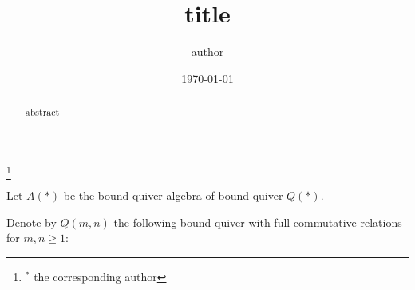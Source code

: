 \documentclass[a4paper, reqno]{amsart}
\theoremstyle{definition}
\theoremstyle{remark}
\numberwithin{equation}{section}
\begin{document}


\title[title]{title}

\author[author]{author}
\address{address}

\makeatletter {} \makeatother

\thanks{$^*$ the corresponding author}
\date{\today}
%
\maketitle


\begin{abstract}
abstract
\end{abstract}






Let $A(*)$ be the bound quiver algebra of bound quiver $Q(*)$.

Denote by $Q(m,n)$ the following bound quiver with full commutative relations for $m,n \geq 1$:
\end{document}
